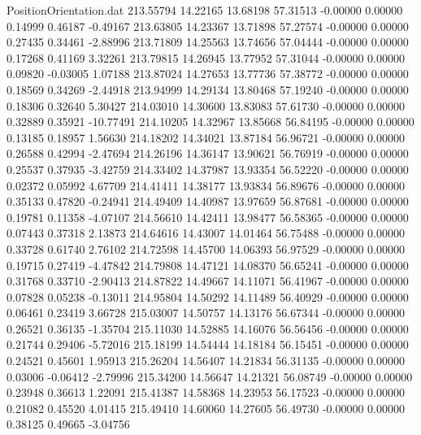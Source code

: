 \begin{filecontents}{PositionOrientation.dat}
 213.55794   14.22165   13.68198    57.31513   -0.00000    0.00000    0.14999    0.46187   -0.49167
 213.63805   14.23367   13.71898    57.27574   -0.00000    0.00000    0.27435    0.34461   -2.88996
 213.71809   14.25563   13.74656    57.04444   -0.00000    0.00000    0.17268    0.41169    3.32261
 213.79815   14.26945   13.77952    57.31044   -0.00000    0.00000    0.09820   -0.03005    1.07188
 213.87024   14.27653   13.77736    57.38772   -0.00000    0.00000    0.18569    0.34269   -2.44918
 213.94999   14.29134   13.80468    57.19240   -0.00000    0.00000    0.18306    0.32640    5.30427
 214.03010   14.30600   13.83083    57.61730   -0.00000    0.00000    0.32889    0.35921  -10.77491
 214.10205   14.32967   13.85668    56.84195   -0.00000    0.00000    0.13185    0.18957    1.56630
 214.18202   14.34021   13.87184    56.96721   -0.00000    0.00000    0.26588    0.42994   -2.47694
 214.26196   14.36147   13.90621    56.76919   -0.00000    0.00000    0.25537    0.37935   -3.42759
 214.33402   14.37987   13.93354    56.52220   -0.00000    0.00000    0.02372    0.05992    4.67709
 214.41411   14.38177   13.93834    56.89676   -0.00000    0.00000    0.35133    0.47820   -0.24941
 214.49409   14.40987   13.97659    56.87681   -0.00000    0.00000    0.19781    0.11358   -4.07107
 214.56610   14.42411   13.98477    56.58365   -0.00000    0.00000    0.07443    0.37318    2.13873
 214.64616   14.43007   14.01464    56.75488   -0.00000    0.00000    0.33728    0.61740    2.76102
 214.72598   14.45700   14.06393    56.97529   -0.00000    0.00000    0.19715    0.27419   -4.47842
 214.79808   14.47121   14.08370    56.65241   -0.00000    0.00000    0.31768    0.33710   -2.90413
 214.87822   14.49667   14.11071    56.41967   -0.00000    0.00000    0.07828    0.05238   -0.13011
 214.95804   14.50292   14.11489    56.40929   -0.00000    0.00000    0.06461    0.23419    3.66728
 215.03007   14.50757   14.13176    56.67344   -0.00000    0.00000    0.26521    0.36135   -1.35704
 215.11030   14.52885   14.16076    56.56456   -0.00000    0.00000    0.21744    0.29406   -5.72016
 215.18199   14.54444   14.18184    56.15451   -0.00000    0.00000    0.24521    0.45601    1.95913
 215.26204   14.56407   14.21834    56.31135   -0.00000    0.00000    0.03006   -0.06412   -2.79996
 215.34200   14.56647   14.21321    56.08749   -0.00000    0.00000    0.23948    0.36613    1.22091
 215.41387   14.58368   14.23953    56.17523   -0.00000    0.00000    0.21082    0.45520    4.01415
 215.49410   14.60060   14.27605    56.49730   -0.00000    0.00000    0.38125    0.49665   -3.04756

\end{filecontents}
